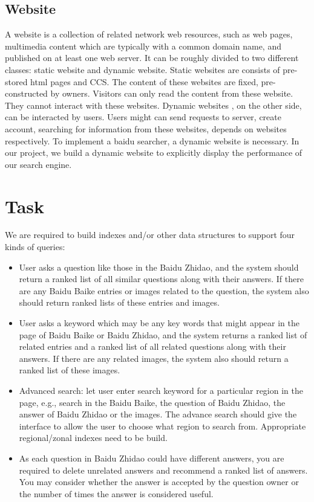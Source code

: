 \documentclass[10pt,times,twocolumn]{article}
\begin{document}
\subsection{Website}
A website is a collection of related network web resources, such as web pages, multimedia content which are typically with a common domain name, and published on at least one web server. \cite{wiki:website} It can be roughly divided to two different classes: static website and dynamic website.
\newline
Static websites are consists of pre-stored html pages and CCS. The content of these websites are fixed, pre-constructed by owners. Visitors can only read the content from these website. They cannot interact with these websites.
\newline
Dynamic websites , on the other side, can be interacted by users. Users might can send requests to server, create account, searching for information from these websites, depends on websites respectively. 
\newline
To implement a baidu searcher, a dynamic website is necessary. In our project,  we build a dynamic website to explicitly display the performance of our search engine.


\section{Task}
We are required to build indexes and/or other data structures to support four kinds of queries:
\begin{itemize}
    \item User asks a question like those in the Baidu Zhidao, and the system should return a ranked list of all similar questions along with their answers. If there are any Baidu Baike entries or images related to the question, the system also should return ranked lists of these entries and images. 
    \item User asks a keyword which may be any key words that might appear in the page of Baidu Baike or Baidu Zhidao, and the system returns a ranked list of related entries and a ranked list of all related questions along with their answers. If there are any related images, the system also should return a ranked list of these images. 
    \item Advanced search: let user enter search keyword for a particular region in the page, e.g., search in the Baidu Baike, the question of Baidu Zhidao, the answer of Baidu Zhidao or the images. The advance search should give the interface to allow the user to choose what region to search from. Appropriate regional/zonal indexes need to be build. 
    \item As each question in Baidu Zhidao could have different answers, you are required to delete unrelated answers and recommend a ranked list of answers. You may consider whether the answer is accepted by the question owner or the number of times the answer is considered useful.
\end{itemize}
\end{document}
